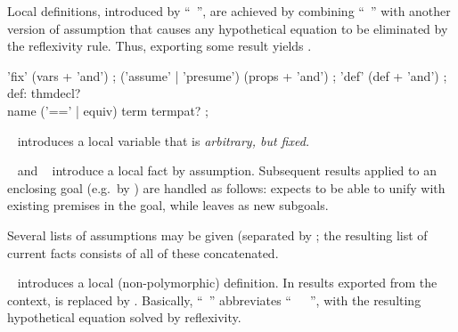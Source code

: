 \begin{isabellebody}
\begin{isamarkuptext}
  Local definitions, introduced by ``\mbox{}~'', are achieved by combining ``\mbox{}~'' with
  another version of assumption that causes any hypothetical equation
   to be eliminated by the reflexivity rule.  Thus,
  exporting some result  yields .

  \begin{rail}
    'fix' (vars + 'and')
    ;
    ('assume' | 'presume') (props + 'and')
    ;
    'def' (def + 'and')
    ;
    def: thmdecl? \\ name ('==' | equiv) term termpat?
    ;
  \end{rail}

  \begin{descr}
  
  \item [\mbox{\isa{\isacommand{fix}}}~\isa{x}] introduces a local variable
   that is \emph{arbitrary, but fixed.}
  
  \item [\mbox{\isa{\isacommand{assume}}}~\isa{{\isachardoublequote}a{\isacharcolon}\ {\isasymphi}{\isachardoublequote}} and \mbox{\isa{\isacommand{presume}}}~\isa{{\isachardoublequote}a{\isacharcolon}\ {\isasymphi}{\isachardoublequote}}] introduce a local fact \isa{{\isachardoublequote}{\isasymphi}\ {\isasymturnstile}\ {\isasymphi}{\isachardoublequote}} by
  assumption.  Subsequent results applied to an enclosing goal (e.g.\
  by \mbox{}) are handled as follows: \mbox{} expects to be able to unify with existing premises in the
  goal, while \mbox{\isa{\isacommand{presume}}} leaves \isa{{\isasymphi}} as new subgoals.
  
  Several lists of assumptions may be given (separated by
  \mbox{}; the resulting list of current facts consists
  of all of these concatenated.
  
  \item [\mbox{\isa{\isacommand{def}}}~\isa{{\isachardoublequote}x\ {\isasymequiv}\ t{\isachardoublequote}}] introduces a local
  (non-polymorphic) definition.  In results exported from the context,
  \isa{x} is replaced by \isa{t}.  Basically, ``\mbox{}~'' abbreviates ``\mbox{}~~\mbox{}~'', with the resulting
  hypothetical equation solved by reflexivity.
  

\end{descr}
\end{isamarkuptext}
\end{isabellebody}
